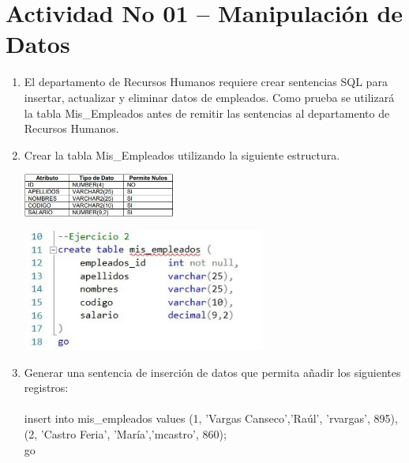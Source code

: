 \section{Actividad No 01 – Manipulaci\'on de Datos} 

\begin{enumerate}[1.]
	\item El departamento de Recursos Humanos requiere crear sentencias SQL para insertar, actualizar y eliminar datos de empleados. Como prueba se utilizará la tabla Mis\_Empleados antes de remitir las sentencias al departamento de Recursos Humanos.

	\item Crear la tabla Mis\_Empleados utilizando la siguiente estructura.
	\begin{center}
	\includegraphics[width=5cm]{./Imagenes/imagen0102} 
	\end{center}
	\begin{center}
	\includegraphics[width=8cm]{./Imagenes/img2} 
	\end{center}
	\item Generar una sentencia de inserción de datos que permita añadir los siguientes registros:
	\\
	\\ insert into mis\_empleados values (1, 'Vargas Canseco','Raúl', 'rvargas', 895),(2, 'Castro Feria',  'María','mcastro', 860);
	\\ go


\end{enumerate}
